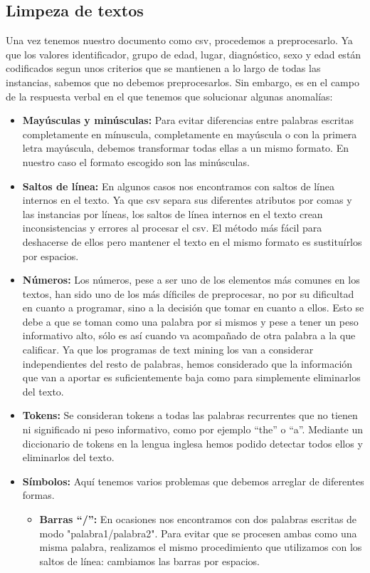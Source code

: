 \documentclass[10pt,a4paper]{article}
\begin{document}
\subsection{Limpeza de textos}
Una vez tenemos nuestro documento como csv, procedemos a preprocesarlo. Ya que los valores identificador, grupo de edad, lugar, diagnóstico, sexo y edad están codificados segun unos criterios que se mantienen a lo largo de todas las instancias, sabemos que no debemos preprocesarlos. Sin embargo, es en el campo de la respuesta verbal en el que tenemos que solucionar algunas anomalías:
\begin{itemize}
\item \textbf{Mayúsculas y minúsculas:} Para evitar diferencias entre palabras escritas completamente en mínuscula, completamente en mayúscula o con la primera letra mayúscula, debemos transformar todas ellas a un mismo formato. En nuestro caso el formato escogido son las minúsculas.
\item \textbf{Saltos de línea:} En algunos casos nos encontramos con saltos de línea internos en el texto. Ya que csv separa sus diferentes atributos por comas y las instancias por líneas, los saltos de línea internos en el texto crean inconsistencias y errores al procesar el csv. El método más fácil para deshacerse de ellos pero mantener el texto en el mismo formato es sustituírlos por espacios.
\item \textbf{Números:} Los números, pese a ser uno de los elementos más comunes en los textos, han sido uno de los más díficiles de preprocesar, no por su dificultad en cuanto a programar, sino a la decisión que tomar en cuanto a ellos. Esto se debe a que se toman como una palabra por si mismos y pese a tener un peso informativo alto, sólo es así cuando va acompañado de otra palabra a la que calificar. Ya que los programas de text mining los van a considerar independientes del resto de palabras, hemos considerado que la información que van a aportar es suficientemente baja como para simplemente eliminarlos del texto.
\item \textbf{Tokens:} Se consideran tokens a todas las palabras recurrentes que no tienen ni significado ni peso informativo, como por ejemplo ``the'' o ``a''. Mediante un diccionario de tokens en la lengua inglesa hemos podido detectar todos ellos y eliminarlos del texto.
\item \textbf{Símbolos:} Aquí tenemos varios problemas que debemos arreglar de diferentes formas.
\begin{itemize} 
\item \textbf{Barras ``/'':} En ocasiones nos encontramos con dos palabras escritas de modo "palabra1/palabra2". Para evitar que se procesen ambas como una misma palabra, realizamos el mismo procedimiento que utilizamos con los saltos de línea: cambiamos las barras por espacios.

\end{itemize}
\end{itemize}
\end{document}
